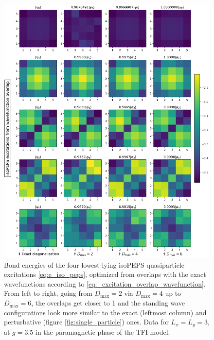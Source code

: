 \newpage
\begin{figure}[H]
  \centering
  \includegraphics[width=\linewidth]{excitations_3_3_3.5_overlap_wavefunction.png}
  \caption{Bond energies of the four lowest-lying isoPEPS quasiparticle excitations \eqref{eq:e_iso_peps}, optimized from overlaps with the exact wavefunctions according to \eqref{eq:_excitation_overlap_wavefunction}. From left to right, going from $D_{\text{max}} = 2$ via $D_{\text{max}} = 4$ up to $D_{\text{max}} = 6$, the overlaps get closer to 1 and the standing wave configurations look more similar to the exact (leftmost column) and perturbative (figure \ref{fig:single_particle}) ones. Data for $L_x = L_y = 3$, at $g = 3.5$ in the paramagnetic phase of the TFI model.}
 \label{fig:excitations_overlap_wavefunction}
\end{figure}

